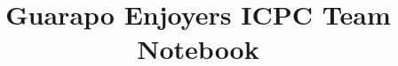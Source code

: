 \documentclass[8pt]{article}
\title{\vspace{-4ex}\Large{Guarapo Enjoyers ICPC Team Notebook}}
\author{}
\date{}
\begin{document}
\begin{landscape}
\setlength{\columnseprule}{0.4pt}
\setlength{\columnsep}{40pt}
\begin{multicols}{2}
\maketitle
\vspace{-13ex}
\tableofcontents
\pagestyle{fancy}



\end{multicols}
\pagebreak
\setlength{\columnseprule}{0pt}
\begin{multicols}{2}

\end{multicols}

\pagebreak



\end{landscape}
\end{document}
